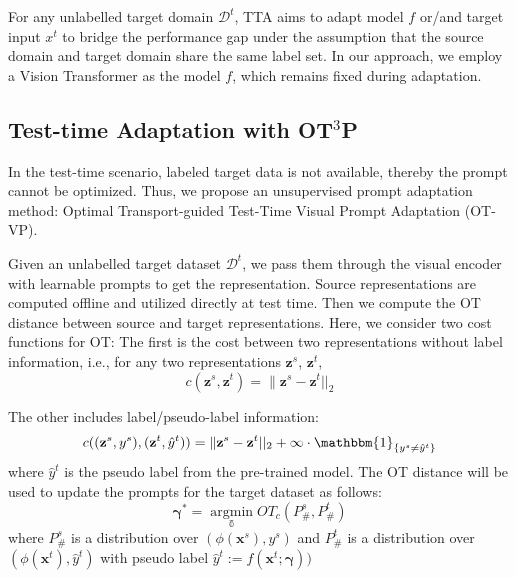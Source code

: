 \documentclass[11pt,a4paper]{article}
\begin{document}
For any unlabelled target domain $\mathcal{D}^t$, TTA aims to adapt model $f$ or/and target input $x^t$ to bridge the performance gap under the assumption that the source domain and target domain share the same label set. In our approach, we employ a Vision Transformer as the model $f$, which remains fixed during adaptation.

\subsection{Test-time Adaptation with OT$^3$P}
\label{ot-vp}
In the test-time scenario, labeled target data is not available, thereby the prompt cannot be optimized. 
Thus, we propose an unsupervised prompt adaptation method: Optimal Transport-guided Test-Time Visual Prompt Adaptation (OT-VP). 

Given an unlabelled target dataset $\mathcal{D}^t$, we pass them through the visual encoder with learnable prompts to get the representation. 
Source representations are computed offline and utilized directly at test time. 
Then we compute the OT distance between source and target representations. 
Here, we consider two cost functions for OT: The first is the cost between two representations without label information, i.e., for any two representations $\mathbf{z}^s$, $\mathbf{z}^t$, 
\begin{equation}
    c(\mathbf{z}^s, \mathbf{z}^t) = \|\mathbf{z}^s- \mathbf{z}^t||_2
\end{equation}

The other includes label/pseudo-label information:
\begin{equation}
    c((\mathbf{z}^s, y^s), (\mathbf{z}^t, \hat y^t)) = \|\mathbf{z}^s- \mathbf{z}^t||_2 + \infty \cdot \mathbbm{1}_{\{y^s \neq \hat y^t\}}
\end{equation}
where $\hat y^t$ is the pseudo label from the pre-trained model.
The OT distance will be used to update the prompts for the target dataset as follows:
\begin{equation}
\label{eq:ot-vp}
    \mathbf{\gamma}^* = \mathop{\arg \min}\limits_{\mathbb{\gamma}} OT_c(P^s_\#, P^t_\#)
\end{equation}
where $P^s_\#$ is a distribution over $(\phi(\mathbf{x}^s), y^s)$ and $P^t_\#$ is a distribution over $(\phi(\mathbf{x}^t), \hat y^t)$ with pseudo label $\hat y^t := f(\mathbf{x}^t; \mathbf{\gamma}))$
\end{document}

